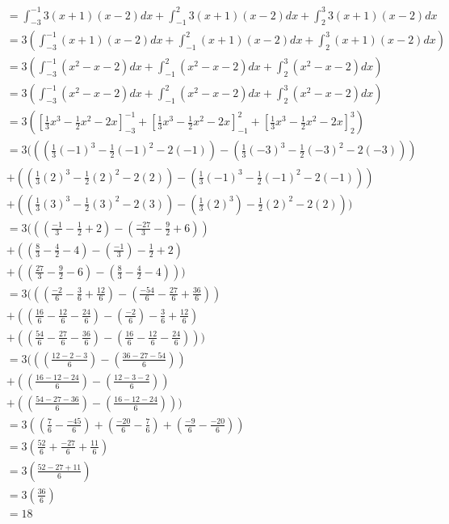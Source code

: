 \documentclass{article}
\begin{document}
\begin{align*}
    &= \int_{-3}^{-1}3(x+1)(x-2)dx  + \int_{-1}^{2}3(x+1)(x-2)dx + \int_{2}^{3}3(x+1)(x-2)dx \\
    &= 3 (\int_{-3}^{-1}(x+1)(x-2)dx  + \int_{-1}^{2}(x+1)(x-2)dx + \int_{2}^{3}(x+1)(x-2)dx) \\
    &= 3 (\int_{-3}^{-1}(x^2-x-2) dx  + \int_{-1}^{2}(x^2-x-2) dx + \int_{2}^{3}(x^2-x-2) dx) \\
    &= 3 (\int_{-3}^{-1}(x^2-x-2) dx  + \int_{-1}^{2}(x^2-x-2) dx + \int_{2}^{3}(x^2-x-2) dx) \\
    &= 3 ([\frac{1}{3}x^3 - \frac{1}{2} x^2 - 2x]^{-1}_{-3} + [\frac{1}{3}x^3 - \frac{1}{2} x^2 - 2x]^2_{-1} + [\frac{1}{3}x^3 - \frac{1}{2} x^2 - 2x]^3_2) \\
    &= 3 (((\frac{1}{3}(-1)^3 - \frac{1}{2} (-1)^2 - 2(-1)) - (\frac{1}{3}(-3)^3 - \frac{1}{2} (-3)^2 - 2(-3))) \\
    &+ ((\frac{1}{3}(2)^3 - \frac{1}{2} (2)^2 - 2(2)) - (\frac{1}{3}(-1)^3 - \frac{1}{2} (-1)^2 - 2(-1))) \\
    &+ ((\frac{1}{3}(3)^3 - \frac{1}{2} (3)^2 - 2(3)) - (\frac{1}{3}(2)^3) - \frac{1}{2} (2)^2 - 2(2))) \\
    &= 3 (((\frac{-1}{3}-\frac{1}{2}+2) - (\frac{-27}{3}-\frac{9}{2}+6)) \\
    &+ ((\frac{8}{3}-\frac{4}{2}-4) - (\frac{-1}{3})-\frac{1}{2}+2) \\
    &+ ((\frac{27}{3} - \frac{9}{2} - 6) - (\frac{8}{3}-\frac{4}{2}-4))) \\
    &= 3 (((\frac{-2}{6}-\frac{3}{6}+\frac{12}{6}) - (\frac{-54}{6}-\frac{27}{6}+\frac{36}{6})) \\
    &+ ((\frac{16}{6}-\frac{12}{6}-\frac{24}{6}) - (\frac{-2}{6})-\frac{3}{6}+\frac{12}{6}) \\
    &+ ((\frac{54}{6} - \frac{27}{6} - \frac{36}{6}) - (\frac{16}{6}-\frac{12}{6}-\frac{24}{6}))) \\
    &= 3 (((\frac{12-2-3}{6}) - (\frac{36-27-54}{6})) \\
    &+ ((\frac{16-12-24}{6}) - (\frac{12-3-2}{6})) \\
    &+ ((\frac{54-27-36}{6}) - (\frac{16-12-24}{6}))) \\
    &= 3 ((\frac{7}{6} - \frac{-45}{6}) + (\frac{-20}{6} - \frac{7}{6}) + (\frac{-9}{6} - \frac{-20}{6})) \\ 
    &= 3 (\frac{52}{6} + \frac{-27}{6} + \frac{11}{6}) \\
    &= 3 (\frac{52-27+11}{6}) \\
    &= 3 (\frac{36}{6}) \\
    &= 18
\end{align*}
\end{document}
